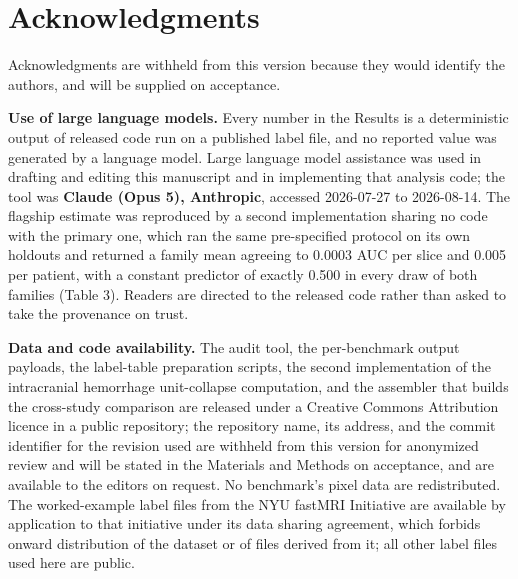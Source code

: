 \documentclass[11pt,letterpaper]{article}
\begin{document}
\clearpage
\section*{Acknowledgments}

Acknowledgments are withheld from this version because they would identify the
authors, and will be supplied on acceptance.

\textbf{Use of large language models.} Every number in the Results is a
deterministic output of released code run on a published label file, and no
reported value was generated by a language model. Large language model
assistance was used in drafting and editing this manuscript and in implementing
that analysis code; the tool was \textbf{Claude (Opus 5), Anthropic}, accessed
2026-07-27 to 2026-08-14. The
flagship estimate was reproduced by a second implementation sharing no code
with the primary one, which ran the same pre-specified protocol on its own
holdouts and returned a family mean agreeing to 0.0003 AUC per slice and 0.005
per patient, with a constant predictor of exactly 0.500 in every draw of both
families (Table 3). Readers are directed to the released code rather than asked
to take the provenance on trust.

\textbf{Data and code availability.} The audit tool, the per-benchmark output
payloads, the label-table preparation scripts, the second implementation
of the intracranial hemorrhage unit-collapse computation, and the assembler
that builds the cross-study comparison are released under a Creative Commons
Attribution licence in a public repository; the repository name, its address, and
the commit identifier for the revision used are withheld from this version for
anonymized review and will be stated in the Materials and Methods on acceptance,
and are available to the editors on request. No benchmark's pixel data are redistributed. The
worked-example label files from the NYU fastMRI Initiative are available by
application to that initiative under its data sharing agreement, which forbids
onward distribution of the dataset or of files derived from it; all other label
files used here are public.

\clearpage



\clearpage
\end{document}
